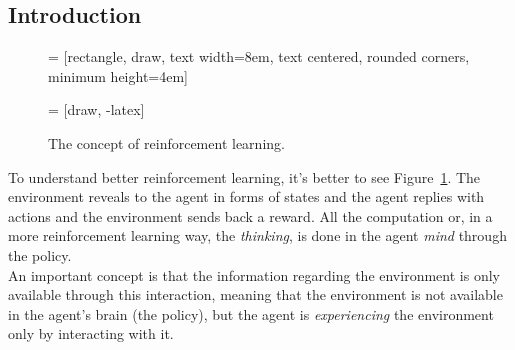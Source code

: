 \subsection{Introduction}
\begin{figure} [ht]
     = [rectangle, draw, 
        text width=8em, text centered, rounded corners, minimum height=4em]
        
     = [draw, -latex]
    \centering
    \caption{The concept of reinforcement learning.}
    \label{fig:rldiagram}
\end{figure}
\noindent
To understand better reinforcement learning, it's better to see Figure~\ref{fig:rldiagram}. The environment reveals to the agent in forms of states and the agent replies with actions and the environment sends back a reward. All the computation or, in a more reinforcement learning way, the \textit{thinking}, is done in the agent \textit{mind} through the policy. \\
An important concept is that the information regarding the environment is only available through this interaction, meaning that the environment is not available in the agent's brain (the policy), but the agent is \textit{experiencing} the environment only by interacting with it.

